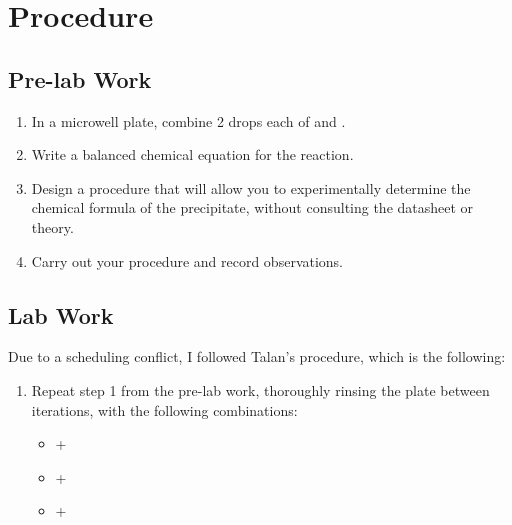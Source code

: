 
\section{Procedure}
\subsection{Pre-lab Work}
\begin{enumerate}
    \item In a microwell plate, combine 2 drops each of  and .
    \item Write a balanced chemical equation for the reaction.
    \item Design a procedure that will allow you to experimentally determine the chemical formula of the precipitate, without consulting the datasheet or theory.
    \item Carry out your procedure and record observations.
\end{enumerate}

\subsection{Lab Work}
Due to a scheduling conflict, I followed Talan's procedure, which is the following:
\begin{enumerate}
    \item Repeat step 1 from the pre-lab work, thoroughly rinsing the plate between iterations, with the following combinations:
    \begin{itemize}
        \item {} + 
        \item {} + 
        \item {} + 
    \end{itemize}
\end{enumerate}